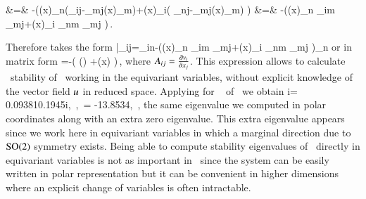 			&=& -\left(\groupTan(x)_n\left(\Lg_{ij}-\Lg_{mj}\groupTan(x)_m\right)+\groupTan(x)_i\left( \Lg_{nj}-\Lg_{mj}\groupTan(x)_m\right) \right)\continue
			&=& -\left(\groupTan(x)_n \Pperp_{im} \Lg_{mj}+\groupTan(x)_i \Pperp_{nm} \Lg_{mj} \right)\,.
\eea

Therefore  takes the form
\beq
	\bar{\Mvar}_{ij}=\Pperp_{in}-\left(\groupTan(x)_n \Pperp_{im} \Lg_{mj}+\groupTan(x)_i \Pperp_{nm} \Lg_{mj} \right)\vf_n
\eeq
or in matrix form
\beq
	\mathbf{\bar{\Mvar}}=\PperpOp {}-\left(  \left(\PperpOp \Lg\right) +\groupTan(x) \otimes {} \right)\,,
	\label{eq:reqvStab}
\eeq
where $A_{ij}=\frac{\partial v_i}{\partial x_j}$. This
expression allows to calculate \reducedsp\ stability of \reqva\ working
in the equivariant variables, without explicit knowledge of
the vector field  $u$ in reduced space. Applying
 for \reqv\  of \cLe\ we obtain
\beq
	\eigRe[1]\pm i\eigIm[1]= 0.0938\pm 10.1945i,\,
    ,\, \eigExp[4]= -13.8534,\, ,
\eeq
the same eigenvalue  we computed in
polar coordinates along with an extra zero eigenvalue. This extra
eigenvalue appears since we work here in equivariant variables
in which a marginal direction due to $\textrm{SO}(2)$ symmetry exists. Being
able to compute stability eigenvalues of \reqva\ directly in
equivariant variables is not as important in \cLe\ since the
system can be easily written in polar representation 
but it can be convenient in higher dimensions where an
explicit change of variables is often intractable.

